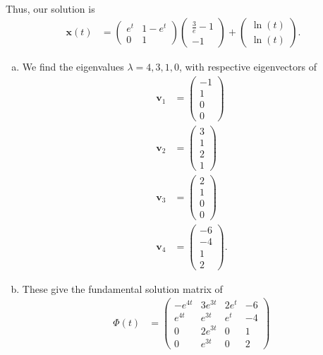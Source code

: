 \documentclass[10pt]{mypackage}
\begin{document}
\begin{solution}[8.3, Problem 32]
\begin{align*}
  \end{align*}
  Thus, our solution is
  \begin{align*}
    \mathbf{x}(t) &= \begin{pmatrix}e^{t} & 1-e^{t} \\ 0 & 1\end{pmatrix} \begin{pmatrix}\frac{3}{e}-1\\-1\end{pmatrix} + \begin{pmatrix}\ln(t)\\\ln(t)\end{pmatrix}.
  \end{align*}
\end{solution}
\begin{solution}[8.3, Problem 35]\hfill
  \begin{enumerate}[(a)]
    \item We find the eigenvalues $\lambda = 4,3,1,0$, with respective eigenvectors of
      \begin{align*}
        \mathbf{v}_1 &= \begin{pmatrix}-1\\1\\0\\0\end{pmatrix}\\
        \mathbf{v}_2 &= \begin{pmatrix}3\\1\\2\\1\end{pmatrix}\\
        \mathbf{v}_3 &= \begin{pmatrix}2\\1\\0\\0\end{pmatrix}\\
        \mathbf{v}_4 &= \begin{pmatrix}-6\\-4\\1\\2\end{pmatrix}.
      \end{align*}
    \item These give the fundamental solution matrix of
      \begin{align*}
        \Phi(t) &= \begin{pmatrix}-e^{4t} & 3e^{3t} & 2e^{t} & -6\\ e^{4t} & e^{3t} & e^{t} & -4\\ 0 & 2e^{3t} & 0 & 1\\0 & e^{3t} & 0 & 2 \end{pmatrix}\\

\end{align*}
\end{enumerate}
\end{solution}
\end{document}
